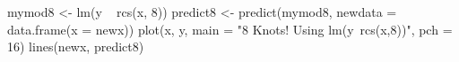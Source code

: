 \begin{Schunk}
\begin{Sinput}
 mymod8 <- lm(y ~ rcs(x, 8))
 predict8 <- predict(mymod8, newdata = data.frame(x = newx))
 plot(x, y, main = "8 Knots! Using lm(y~rcs(x,8))", pch = 16)
 lines(newx, predict8)
\end{Sinput}
\end{Schunk}
